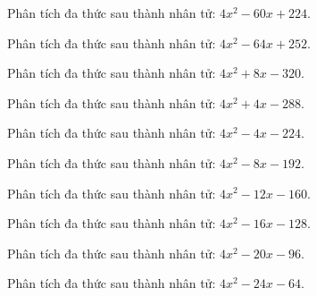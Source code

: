 \begin{bt}
	Phân tích đa thức sau thành nhân tử: $4 x^2 - 60 x + 224$.
\end{bt}
\begin{bt}
	Phân tích đa thức sau thành nhân tử: $4 x^2 - 64 x + 252$.
\end{bt}
\begin{bt}
	Phân tích đa thức sau thành nhân tử: $4 x^2 + 8 x - 320$.
\end{bt}
\begin{bt}
	Phân tích đa thức sau thành nhân tử: $4 x^2 + 4 x - 288$.
\end{bt}
\begin{bt}
	Phân tích đa thức sau thành nhân tử: $4 x^2 - 4 x - 224$.
\end{bt}
\begin{bt}
	Phân tích đa thức sau thành nhân tử: $4 x^2 - 8 x - 192$.
\end{bt}
\begin{bt}
	Phân tích đa thức sau thành nhân tử: $4 x^2 - 12 x - 160$.
\end{bt}
\begin{bt}
	Phân tích đa thức sau thành nhân tử: $4 x^2 - 16 x - 128$.
\end{bt}
\begin{bt}
	Phân tích đa thức sau thành nhân tử: $4 x^2 - 20 x - 96$.
\end{bt}
\begin{bt}
	Phân tích đa thức sau thành nhân tử: $4 x^2 - 24 x - 64$.
\end{bt}
